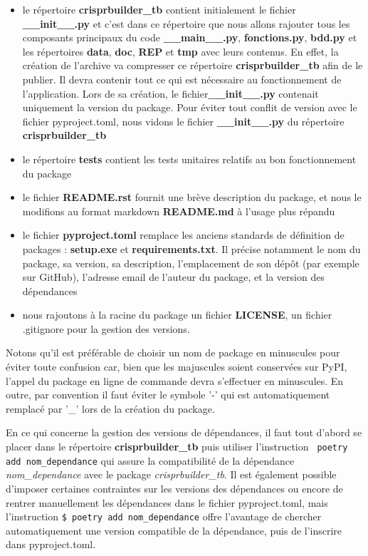 \documentclass[twoside,a4paper,11pt,frenchb,openany]{report}
\begin{document}
\begin{itemize}
\item le répertoire \textbf{crisprbuilder\_tb} contient initialement le fichier \textbf{\_\_init\_\_.py} et c'est dans ce répertoire que nous allons rajouter tous les composants principaux du code  \textbf{\_\_main\_\_.py}, \textbf{fonctions.py}, \textbf{bdd.py} et les répertoires \textbf{data}, \textbf{doc}, \textbf{REP} et \textbf{tmp} avec leurs contenus. En effet, la création de l'archive va compresser ce répertoire \textbf{crisprbuilder\_tb} afin de le publier. Il devra contenir tout ce qui est nécessaire au fonctionnement de l'application. Lors de sa création, le fichier\textbf{\_\_init\_\_.py} contenait uniquement la version du package. Pour éviter tout conflit de version avec le fichier pyproject.toml, nous vidons le fichier \textbf{\_\_init\_\_.py} du répertoire \textbf{crisprbuilder\_tb}
\item le répertoire \textbf{tests} contient les tests unitaires relatifs au bon fonctionnement du package
\item le fichier \textbf{README.rst} fournit une brève description du package, et nous le modifions au format markdown \textbf{README.md} à l'usage plus répandu
\item le fichier \textbf{pyproject.toml} remplace les anciens standards de définition de packages : \textbf{setup.exe} et \textbf{requirements.txt}. Il précise notamment le nom du package, sa version, sa description, l’emplacement de son dépôt (par exemple sur GitHub), l’adresse email de l’auteur du package, et la version des dépendances
\item nous rajoutons à la racine du package un fichier \textbf{LICENSE}, un fichier .gitignore pour la gestion des versions. 
\end{itemize}

Notons qu'il est préférable de choisir un nom de package en minuscules pour éviter toute confusion car, bien que les majuscules soient conservées sur PyPI, l'appel du package en ligne de commande devra s'effectuer en minuscules. En outre, par convention il faut éviter le symbole '-' qui est automatiquement remplacé par '\_' lors de la création du package.

En ce qui concerne la gestion des versions de dépendances, il faut tout d'abord se placer dans le répertoire \textbf{crisprbuilder\_tb} puis utiliser l’instruction
\texttt{  poetry add nom\_dependance}  
qui assure la compatibilité de la dépendance \textit{nom\_dependance} avec le package \textit{crisprbuilder\_tb}. Il est également possible d’imposer certaines contraintes sur les versions des dépendances ou encore de rentrer manuellement les dépendances dans le fichier pyproject.toml, mais l’instruction 
\texttt{\$ poetry add nom\_dependance} 
offre l’avantage de chercher automatiquement une version compatible de la dépendance, puis de l’inscrire dans pyproject.toml.
\end{document}
